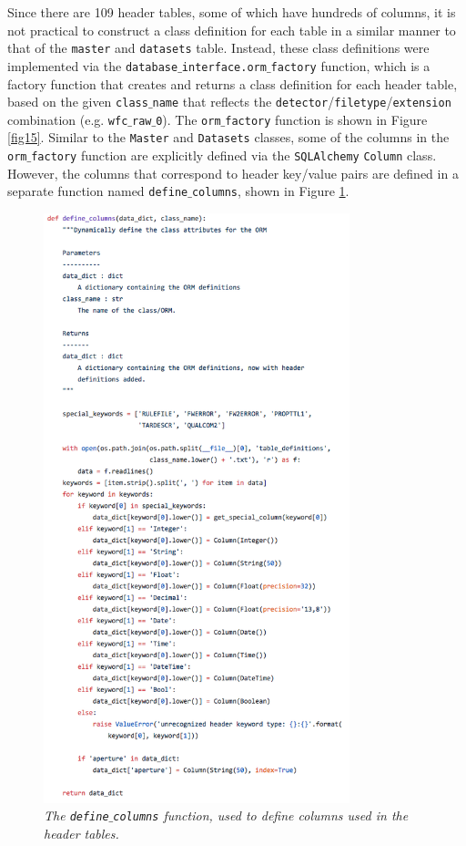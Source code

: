 \documentclass[10pt,journal,compsoc]{IEEEtran}
\begin{document}
Since there are 109 header tables, some of which have hundreds of columns, it is not practical to construct a class definition for each table in a similar manner to that of the
\texttt{master} and \texttt{datasets} table.  Instead, these class definitions were implemented via the \texttt{database$\_$interface.orm$\_$factory} function, which is a factory
function that creates and returns a class definition for each header table, based on the given \texttt{class$\_$name} that reflects the
\texttt{detector}/\texttt{filetype}/\texttt{extension} combination (e.g. \texttt{wfc$\_$raw$\_$0}).  The \texttt{orm$\_$factory} function is shown in Figure \ref{fig15}.  Similar to the
\texttt{Master} and \texttt{Datasets} classes, some of the columns in the \texttt{orm$\_$factory} function are explicitly defined via the \texttt{SQLAlchemy} \texttt{Column} class.
However, the columns that correspond to header key/value pairs are defined in a separate function named \texttt{define$\_$columns}, shown in Figure \ref{fig16}.

\begin{figure}[!h]
\centering
\includegraphics[width=3.5in]{./figures/define_columns.png}
\caption{\textit{The \texttt{define$\_$columns} function, used to define columns used in the header tables.}}
\label{fig16}
\end{figure}
\end{document}
